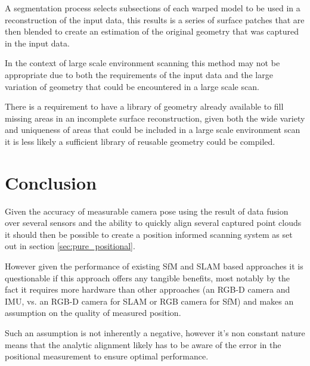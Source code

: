\documentclass{entcs}
\begin{document}
A segmentation process selects subsections of each warped model to be used in a
reconstruction of the input data, this results is a series of surface patches
that are then blended to create an estimation of the original geometry that was
captured in the input data.

In the context of large scale environment scanning this method may not be
appropriate due to both the requirements of the input data and the large
variation of geometry that could be encountered in a large scale scan.

There is a requirement to have a library of geometry already available to fill
missing areas in an incomplete surface reconstruction, given both the wide
variety and uniqueness of areas that could be included in a large scale
environment scan it is less likely a sufficient library of reusable geometry
could be compiled.

\section{Conclusion}
\label{sec:conclusion}

Given the accuracy of measurable camera pose using the result of data fusion
over several sensors and the ability to quickly align several captured point
clouds it should then be possible to create a position informed scanning system
as set out in section \ref{sec:pure_positional}.

However given the performance of existing SfM and SLAM based approaches it is
questionable if this approach offers any tangible benefits, most notably by the
fact it requires more hardware than other approaches (an RGB-D camera and IMU,
vs. an RGB-D camera for SLAM or RGB camera for SfM) and makes an assumption on
the quality of measured position.

Such an assumption is not inherently a negative, however it's non constant
nature means that the analytic alignment likely has to be aware of the error in
the positional measurement to ensure optimal performance.

\printbibliography
\end{document}
